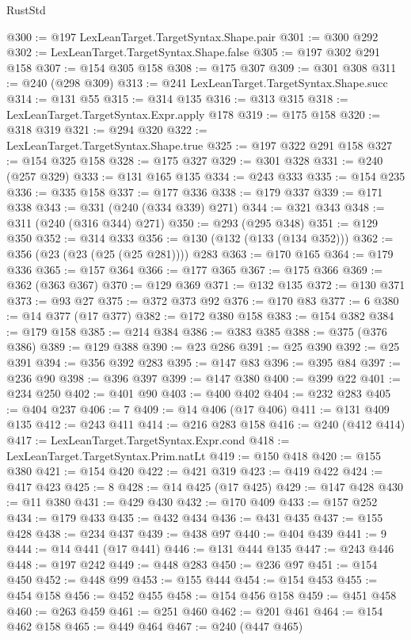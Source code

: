 \begin{lexlean}{RustStd}
\begin{coremodule}
@300 := @197 LexLeanTarget.TargetSyntax.Shape.pair
@301 := @300 @292
@302 := LexLeanTarget.TargetSyntax.Shape.false
@305 := @197 @302 @291 @158
@307 := @154 @305 @158
@308 := @175 @307
@309 := @301 @308
@311 := @240 (@298 @309)
@313 := @241 LexLeanTarget.TargetSyntax.Shape.succ
@314 := @131 @55
@315 := @314 @135
@316 := @313 @315
@318 := LexLeanTarget.TargetSyntax.Expr.apply @178
@319 := @175 @158
@320 := @318 @319
@321 := @294 @320
@322 := LexLeanTarget.TargetSyntax.Shape.true
@325 := @197 @322 @291 @158
@327 := @154 @325 @158
@328 := @175 @327
@329 := @301 @328
@331 := @240 (@257 @329)
@333 := @131 @165 @135
@334 := @243 @333
@335 := @154 @235
@336 := @335 @158
@337 := @177 @336
@338 := @179 @337
@339 := @171 @338
@343 := @331 (@240 (@334 @339) @271)
@344 := @321 @343
@348 := @311 (@240 (@316 @344) @271)
@350 := @293 (@295 @348)
@351 := @129 @350
@352 := @314 @333
@356 := @130 (@132 (@133 (@134 @352)))
@362 := @356 (@23 (@23 (@25 (@25 @281)))) @283
@363 := @170 @165
@364 := @179 @336
@365 := @157 @364
@366 := @177 @365
@367 := @175 @366
@369 := @362 (@363 @367)
@370 := @129 @369
@371 := @132 @135
@372 := @130 @371
@373 := @93 @27
@375 := @372 @373 @92
@376 := @170 @83
@377 := 6
@380 := @14 @377 (@17 @377)
@382 := @172 @380 @158
@383 := @154 @382
@384 := @179 @158
@385 := @214 @384
@386 := @383 @385
@388 := @375 (@376 @386)
@389 := @129 @388
@390 := @23 @286
@391 := @25 @390
@392 := @25 @391
@394 := @356 @392 @283
@395 := @147 @83
@396 := @395 @84
@397 := @236 @90
@398 := @396 @397
@399 := @147 @380
@400 := @399 @22
@401 := @234 @250
@402 := @401 @90
@403 := @400 @402
@404 := @232 @283
@405 := @404 @237
@406 := 7
@409 := @14 @406 (@17 @406)
@411 := @131 @409 @135
@412 := @243 @411
@414 := @216 @283 @158
@416 := @240 (@412 @414)
@417 := LexLeanTarget.TargetSyntax.Expr.cond
@418 := LexLeanTarget.TargetSyntax.Prim.natLt
@419 := @150 @418
@420 := @155 @380
@421 := @154 @420
@422 := @421 @319
@423 := @419 @422
@424 := @417 @423
@425 := 8
@428 := @14 @425 (@17 @425)
@429 := @147 @428
@430 := @11 @380
@431 := @429 @430
@432 := @170 @409
@433 := @157 @252
@434 := @179 @433
@435 := @432 @434
@436 := @431 @435
@437 := @155 @428
@438 := @234 @437
@439 := @438 @97
@440 := @404 @439
@441 := 9
@444 := @14 @441 (@17 @441)
@446 := @131 @444 @135
@447 := @243 @446
@448 := @197 @242
@449 := @448 @283
@450 := @236 @97
@451 := @154 @450
@452 := @448 @99
@453 := @155 @444
@454 := @154 @453
@455 := @454 @158
@456 := @452 @455
@458 := @154 @456 @158
@459 := @451 @458
@460 := @263 @459
@461 := @251 @460
@462 := @201 @461
@464 := @154 @462 @158
@465 := @449 @464
@467 := @240 (@447 @465)

\end{coremodule}
\end{lexlean}
